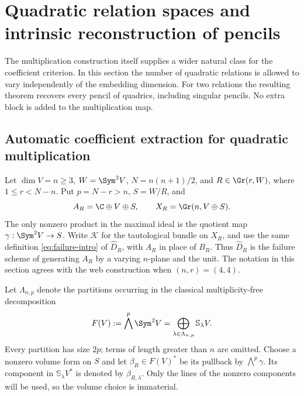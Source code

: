 \section{Quadratic relation spaces and intrinsic reconstruction of pencils}
\label{sec:natural-pencils}

The multiplication construction itself supplies a wider natural class
for the coefficient criterion.  In this section the number of quadratic
relations is allowed to vary independently of the embedding dimension.
For two relations the resulting theorem recovers every pencil of
quadrics, including singular pencils.  No extra block is added to the
multiplication map.

\subsection{Automatic coefficient extraction for quadratic multiplication}

Let \(\dim V=n\ge3\), \(W=\Sym^2V\), \(N=n(n+1)/2\), and
\(R\in\Gr(r,W)\), where \(1\le r<N-n\).  Put \(p=N-r>n\),
\(S=W/R\), and
\[
 A_R=\C\oplus V\oplus S,\qquad
 X_R=\Gr(n,V\oplus S).
\]
The only nonzero product in the maximal ideal is the quotient map
\(\gamma:\Sym^2V\to S\).  Write \(\mathcal K\) for the
tautological bundle on \(X_R\), and use the same definition
\eqref{eq:failure-intro} of \(\widehat D_R\), with \(A_R\) in
place of \(B_R\).  Thus \(\widehat D_R\) is the failure scheme
of generating \(A_R\) by a varying \(n\)-plane and the unit.
The notation in this section agrees with the web construction when
\((n,r)=(4,4)\).

Let \(\Lambda_{n,p}\) denote the partitions occurring in the
classical multiplicity-free decomposition
\begin{equation}\label{eq:general-exterior-decomposition}
 F(V):=\bigwedge^p\Sym^2V
       =\bigoplus_{\lambda\in\Lambda_{n,p}}\mathbb S_\lambda V.
\end{equation}
Every partition has size \(2p\); terms of length greater than \(n\)
are omitted.  Choose a nonzero volume form on \(S\) and let
\(\beta_R\in F(V)^*\) be its pullback by \(\bigwedge^p\gamma\).
Its component in \(\mathbb S_\lambda V^*\) is denoted by
\(\beta_{R,\lambda}\).  Only the lines of the nonzero components
will be used, so the volume choice is immaterial.

